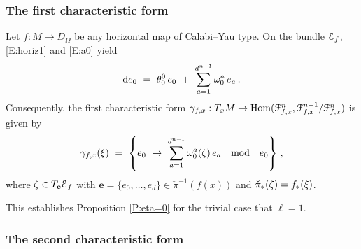 \documentclass[12pt]{amsart}
\numberwithin{equation}{section}
\numberwithin{table}{section}
\numberwithin{figure}{section}
\begin{document}
\subsubsection{The first characteristic form} \label{S:1}

Let $f : M \to \check D_\Omega$ be any horizontal map of Calabi--Yau type.  On the bundle $\mathcal E_f$, \eqref{E:horiz1} and \eqref{E:a0} yield
\[
  \mathrm{d} e_0 \ = \ \theta^0_0 \, e_0 \ + \ \sum_{a = 1}^{d^{n-1}} \omega^a_0 \,e_a \,.
\]
Consequently, the first characteristic form $\gamma_{f,x} : T_x M \to \mathrm{Hom}(\mathcal F^n_{f,x} , \mathcal F^{n-1}_{f,x}/\mathcal F^n_{f,x} )$ is given by 
\begin{equation}\label{E:cf1}
  \gamma_{f,x}(\xi) \ = \ 
  \left\{ e_0 \ \mapsto \ \sum_{a = 1}^{d^{n-1}} \w^a_0(\z) \,e_a 
  \quad\hbox{mod} \quad e_0 \right\} \,,
\end{equation}
where $\zeta \in T_\mathbf{e} \mathcal E_f$ with $\mathbf{e} = \{ e_0 , \ldots , e_d\} \in \check\pi^{-1}(f(x))$ and $\check\pi_*(\zeta) = f_*(\xi)$.  

This establishes Proposition \ref{P:eta=0} for the trivial case that $\ell=1$.

\subsubsection{The second characteristic form} \label{S:2}
\end{document}
